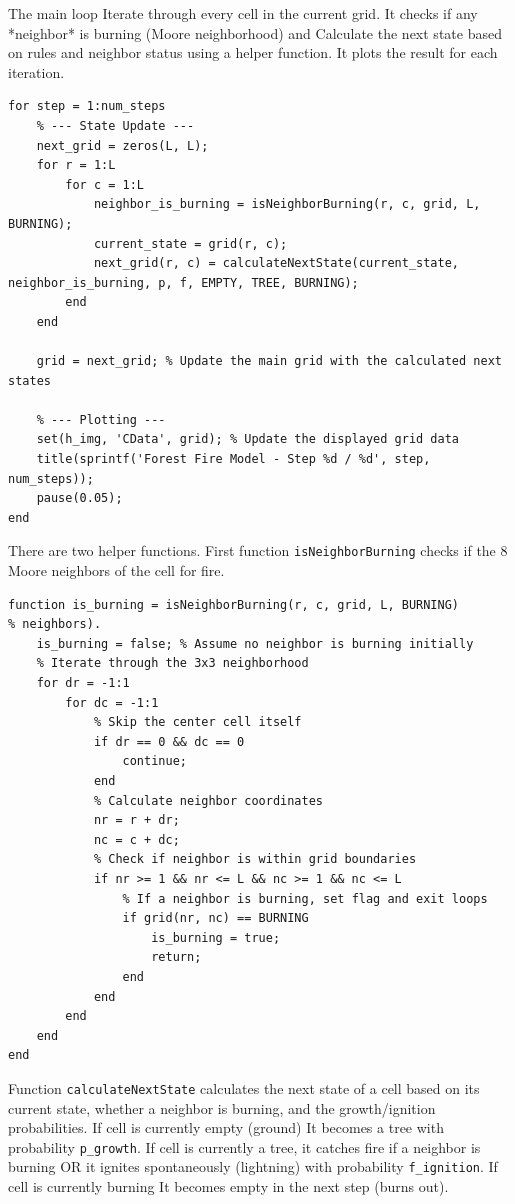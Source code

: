 \documentclass{article}
\begin{document}
The main loop Iterate through every cell in the current grid. It checks if any *neighbor* is burning (Moore neighborhood) and Calculate the next state based on rules and neighbor status using a helper function. It plots the result for each iteration.
\begin{lstlisting}[caption={Main code}]
for step = 1:num_steps
    % --- State Update ---
    next_grid = zeros(L, L); 
    for r = 1:L
        for c = 1:L 
            neighbor_is_burning = isNeighborBurning(r, c, grid, L, BURNING);
            current_state = grid(r, c);
            next_grid(r, c) = calculateNextState(current_state, neighbor_is_burning, p, f, EMPTY, TREE, BURNING);
        end
    end

    grid = next_grid; % Update the main grid with the calculated next states

    % --- Plotting ---
    set(h_img, 'CData', grid); % Update the displayed grid data
    title(sprintf('Forest Fire Model - Step %d / %d', step, num_steps));
    pause(0.05); 
end
\end{lstlisting}

There are two helper functions. First function  \texttt{isNeighborBurning} checks if the 8 Moore neighbors of the cell for fire. 

\begin{lstlisting}[caption={Helper functions}]
function is_burning = isNeighborBurning(r, c, grid, L, BURNING)
% neighbors).
    is_burning = false; % Assume no neighbor is burning initially
    % Iterate through the 3x3 neighborhood
    for dr = -1:1
        for dc = -1:1
            % Skip the center cell itself
            if dr == 0 && dc == 0
                continue;
            end
            % Calculate neighbor coordinates
            nr = r + dr;
            nc = c + dc;
            % Check if neighbor is within grid boundaries
            if nr >= 1 && nr <= L && nc >= 1 && nc <= L
                % If a neighbor is burning, set flag and exit loops
                if grid(nr, nc) == BURNING
                    is_burning = true;
                    return;
                end
            end
        end
    end
end
\end{lstlisting}

Function \texttt{calculateNextState} calculates the next state of a cell based on its current state, whether a neighbor is burning, and the growth/ignition probabilities. If cell is currently empty (ground) It becomes a tree with probability \texttt{p\_growth}.  If cell is currently a tree, it catches fire if a neighbor is burning OR it ignites spontaneously (lightning) with probability \texttt{f\_ignition}. If cell is currently burning It becomes empty in the next step (burns out).
\end{document}
